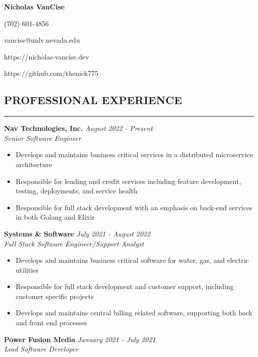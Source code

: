\documentclass{res}
\begin{document}
	\thispagestyle{empty} %
	\centerline{\bf \Large{Nicholas VanCise}}
	\centerline{(702) 601-4856}
	\centerline{vancise@unlv.nevada.edu}
  \centerline{https://nicholas-vancise.dev}
  \centerline{https://github.com/thenick775}
  \vspace{-18pt}

	\begin{resume}

		\section{{PROFESSIONAL EXPERIENCE}}
    \noindent\rule[0.5ex]{\linewidth}{1pt}
    		{\bf Nav Technologies, Inc.} \hfill \emph{August 2022 - Present} \\
			\emph{Senior Software Engineer}

			\begin{itemize} \itemsep -2pt
				\item Develops and maintains business critical services in a distributed microservice architecture
				\item Responsible for lending and credit services including feature development, testing, deployments, and service health
				\item Responsible for full stack development with an emphasis on back-end services in both Golang and Elixir
			\end{itemize} \vspace{-2mm}
    		
    		{\bf Systems \& Software} \hfill \emph{July 2021 - August 2022} \\
			\emph{Full Stack Software Engineer/Support Analyst}

			\begin{itemize} \itemsep -2pt
				\item Develops and maintains business critical software for water, gas, and electric utilities
				\item Responsible for full stack development and customer support, including customer specific projects
				\item Develops and maintains central billing related software, supporting both back and front end processes
			\end{itemize} \vspace{-2mm}
			
	    {\bf Power Fusion Media} \hfill \emph{January 2021 - July 2021} \\
			\emph{Lead Software Developer}


\end{resume}
\end{document}
